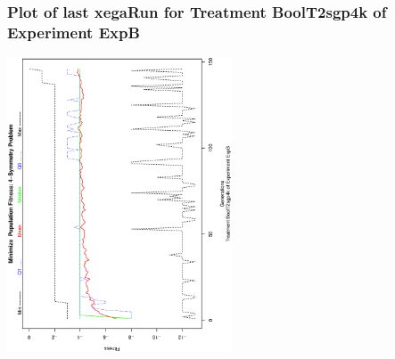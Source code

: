  \begin{frame}
 \frametitle{ Plot of last xegaRun for Treatment BoolT2sgp4k of Experiment ExpB }
 \begin{center}
\includegraphics[width=0.5\textwidth, angle=-90]
{ExpBPlotPopStatsFigure012.eps}
 \end{center}
 \label{report/ExpBPlotPopStatsFigure012.eps}  
 \end{frame}


